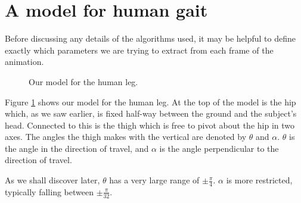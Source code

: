 \section{A model for human gait}
\label{Design:Model}

Before discussing any details of the algorithms used, it may be helpful to define exactly which parameters
we are trying to extract from each frame of the animation.

\begin{figure}[b]
	\centering
	\qquad
	\caption{Our model for the human leg.}
	\label{ModelImages}
\end{figure}

Figure \ref{ModelImages} shows our model for the human leg.
At the top of the model is the hip which, as we saw earlier, is fixed half-way between the ground and the subject's head.
Connected to this is the thigh which is free to pivot about the hip in two axes.
The angles the thigh makes with the vertical are denoted by $\theta$ and $\alpha$.
$\theta$ is the angle in the direction of travel, and $\alpha$ is the angle perpendicular to the direction of travel.

As we shall discover later, $\theta$ has a very large range of $\pm \frac{\pi}{4}$.
$\alpha$ is more restricted, typically falling between $\pm \frac{\pi}{32}$.
